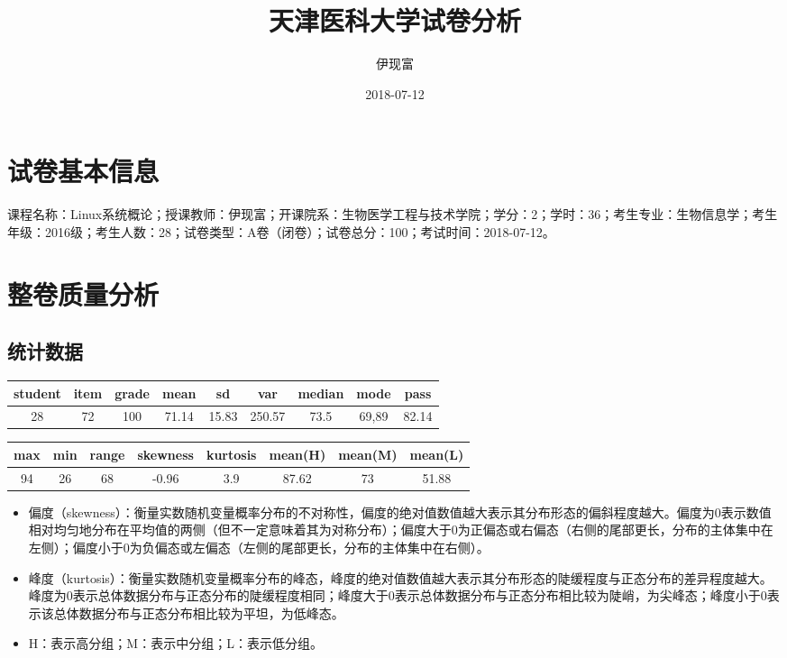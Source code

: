 \documentclass[hyperref,adobefonts]{ctexart}
\title{天津医科大学试卷分析}
\author{伊现富}
\date{2018-07-12}
\providecommand{\tightlist}{\setlength{\itemsep}{0pt}\setlength{\parskip}{0pt}}
\begin{document}
\maketitle

{
\setcounter{tocdepth}{2}
\tableofcontents
}
\section{试卷基本信息}

课程名称：Linux系统概论；授课教师：伊现富；开课院系：生物医学工程与技术学院；学分：2；学时：36；考生专业：生物信息学；考生年级：2016级；考生人数：28；试卷类型：A卷（闭卷）；试卷总分：100；考试时间：2018-07-12。

\section{整卷质量分析}

\subsection{统计数据}

\begin{longtable}{c|c|c|c|c|c|c|c|c}
\hline
student & item & grade & mean & sd & var & median & mode & pass\\
\hline
28 & 72 & 100 & 71.14 & 15.83 & 250.57 & 73.5 & 69,89 & 82.14\\
\hline
\end{longtable}

\begin{longtable}{c|c|c|c|c|c|c|c}
\hline
max & min & range & skewness & kurtosis & mean(H) & mean(M) & mean(L)\\
\hline
94 & 26 & 68 & -0.96 & 3.9 & 87.62 & 73 & 51.88\\
\hline
\end{longtable}

\begin{itemize}
\tightlist
\item
  偏度（skewness）：衡量实数随机变量概率分布的不对称性，偏度的绝对值数值越大表示其分布形态的偏斜程度越大。偏度为0表示数值相对均匀地分布在平均值的两侧（但不一定意味着其为对称分布）；偏度大于0为正偏态或右偏态（右侧的尾部更长，分布的主体集中在左侧）；偏度小于0为负偏态或左偏态（左侧的尾部更长，分布的主体集中在右侧）。
\item
  峰度（kurtosis）：衡量实数随机变量概率分布的峰态，峰度的绝对值数值越大表示其分布形态的陡缓程度与正态分布的差异程度越大。峰度为0表示总体数据分布与正态分布的陡缓程度相同；峰度大于0表示总体数据分布与正态分布相比较为陡峭，为尖峰态；峰度小于0表示该总体数据分布与正态分布相比较为平坦，为低峰态。
\item
  H：表示高分组；M：表示中分组；L：表示低分组。
\end{itemize}
\end{document}
